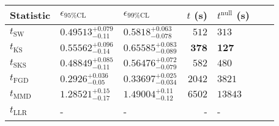 \begin{tabular}{l|llr|llr}
	Statistic & $\epsilon_{95\%\mathrm{CL}}$ & $\epsilon_{99\%\mathrm{CL}}$ & $t$ (s) & $t^{\mathrm{null}}$ (s) \\
	\midrule
	$t_{\mathrm{SW}}$ & $0.49513_{-0.11}^{+0.079}$ & $0.5818_{-0.078}^{+0.063}$ & $512$ & $313$ \\
	$t_{\overline{\mathrm{KS}}}$ & $0.55562_{-0.14}^{+0.096}$ & $0.65585_{-0.089}^{+0.083}$ & ${\mathbf{378}}$ & ${\mathbf{127}}$ \\
	$t_{\mathrm{SKS}}$ & $0.48849_{-0.11}^{+0.085}$ & $0.56476_{-0.079}^{+0.072}$ & $582$ & $480$ \\
	$t_{\mathrm{FGD}}$ & ${\mathbf{0.2926_{-0.05}^{+0.036}}}$ & ${\mathbf{0.33697_{-0.034}^{+0.025}}}$ & $2042$ & $3821$ \\
	$t_{\mathrm{MMD}}$ & $1.28521_{-0.17}^{+0.15}$ & $1.49004_{-0.12}^{+0.11}$ & $6502$ & $13843$ \\
	$t_{\mathrm{LLR}}$ & - & - & - & - \\
	\bottomrule
\end{tabular}